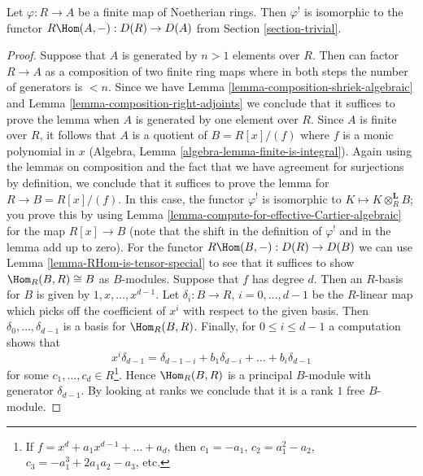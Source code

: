 \begin{lemma}
\label{lemma-upper-shriek-finite}
Let $\varphi : R \to A$ be a finite map of Noetherian rings.
Then $\varphi^!$ is isomorphic to the functor
$R\Hom(A, -) : D(R) \to D(A)$ from
Section \ref{section-trivial}.
\end{lemma}

\begin{proof}
Suppose that $A$ is generated by $n > 1$ elements over $R$.
Then can factor $R \to A$ as a composition of two finite ring maps
where in both steps the number of generators is $< n$.
Since we have Lemma \ref{lemma-composition-shriek-algebraic} and
Lemma \ref{lemma-composition-right-adjoints}
we conclude that it suffices
to prove the lemma when $A$ is generated by one element over $R$.
Since $A$ is finite over $R$, it follows that $A$ is a quotient
of $B = R[x]/(f)$ where $f$ is a monic polynomial in $x$
(Algebra, Lemma \ref{algebra-lemma-finite-is-integral}).
Again using the lemmas on composition and the fact that we
have agreement for surjections by definition, we conclude that
it suffices to prove the lemma for $R \to B = R[x]/(f)$.
In this case, the functor $\varphi^!$ is isomorphic to
$K \mapsto K \otimes_R^\mathbf{L} B$; you prove this by
using Lemma \ref{lemma-compute-for-effective-Cartier-algebraic}
for the map $R[x] \to B$ (note that the shift in the definition
of $\varphi^!$ and in the lemma add up to zero).
For the functor $R\Hom(B, -) : D(R) \to D(B)$ we can use
Lemma \ref{lemma-RHom-is-tensor-special}
to see that it suffices to show $\Hom_R(B, R) \cong B$
as $B$-modules. Suppose that $f$ has degree $d$.
Then an $R$-basis for $B$ is given by $1, x, \ldots, x^{d - 1}$.
Let $\delta_i : B \to R$, $i = 0, \ldots, d - 1$
be the $R$-linear map which picks off the coefficient
of $x^i$ with respect to the given basis. Then
$\delta_0, \ldots, \delta_{d - 1}$ is a basis for $\Hom_R(B, R)$.
Finally, for $0 \leq i \leq d - 1$ a computation shows that
$$
x^i \delta_{d - 1} =
\delta_{d - 1 - i} + b_1 \delta_{d - i} + \ldots + b_i \delta_{d - 1}
$$
for some $c_1, \ldots, c_d \in R$\footnote{If
$f = x^d + a_1 x^{d - 1} + \ldots + a_d$, then
$c_1 = -a_1$, $c_2 = a_1^2 - a_2$, $c_3 = -a_1^3 + 2a_1a_2 -a_3$, etc.}.
Hence $\Hom_R(B, R)$ is a principal $B$-module with generator
$\delta_{d - 1}$. By looking
at ranks we conclude that it is a rank $1$ free $B$-module.
\end{proof}